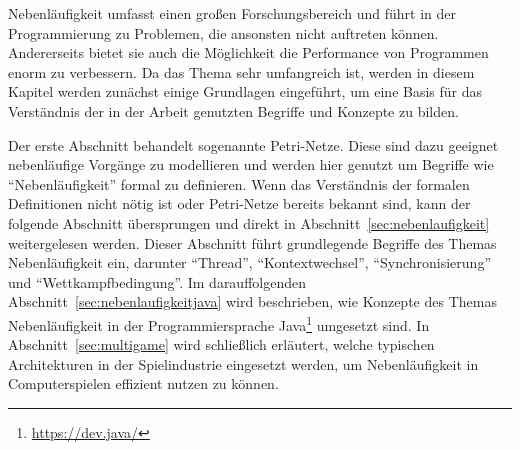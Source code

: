 Nebenläufigkeit umfasst einen großen Forschungsbereich und führt in der Programmierung zu Problemen, die ansonsten nicht auftreten können. Andererseits bietet sie auch die Möglichkeit die Performance von Programmen enorm zu verbessern. Da das Thema sehr umfangreich ist, werden in diesem Kapitel werden zunächst einige Grundlagen eingeführt, um eine Basis für das Verständnis der in der Arbeit genutzten Begriffe und Konzepte zu bilden. 

Der erste Abschnitt behandelt sogenannte Petri-Netze. Diese sind dazu geeignet nebenläufige Vorgänge zu modellieren und werden hier genutzt um Begriffe wie \enquote{Nebenläufigkeit} formal zu definieren. Wenn das Verständnis der formalen Definitionen nicht nötig ist oder Petri-Netze bereits bekannt sind, kann der folgende Abschnitt übersprungen und direkt in Abschnitt~\ref{sec:nebenlaufigkeit} weitergelesen werden. Dieser Abschnitt führt grundlegende Begriffe des Themas Nebenläufigkeit ein, darunter \enquote{Thread}, \enquote{Kontextwechsel}, \enquote{Synchronisierung} und \enquote{Wettkampfbedingung}. Im darauffolgenden Abschnitt~\ref{sec:nebenlaufigkeitjava} wird beschrieben, wie Konzepte des Themas Nebenläufigkeit in der Programmiersprache Java\footnote{\url{https://dev.java/}} umgesetzt sind. In Abschnitt~\ref{sec:multigame} wird schließlich erläutert, welche typischen Architekturen in der Spielindustrie eingesetzt werden, um Nebenläufigkeit in Computerspielen effizient nutzen zu können.